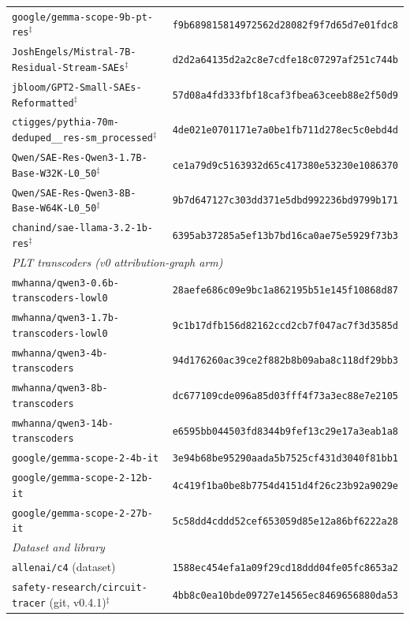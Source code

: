 \begin{table}[h]
\begin{tabular}{ll}
\texttt{google/gemma-scope-9b-pt-res}$^{\ddagger}$ & \texttt{f9b689815814972562d28082f9f7d65d7e01fdc8} \\
\texttt{JoshEngels/Mistral-7B-Residual-Stream-SAEs}$^{\ddagger}$ & \texttt{d2d2a64135d2a2c8e7cdfe18c07297af251c744b} \\
\texttt{jbloom/GPT2-Small-SAEs-Reformatted}$^{\ddagger}$ & \texttt{57d08a4fd333fbf18caf3fbea63ceeb88e2f50d9} \\
\texttt{ctigges/pythia-70m-deduped\_\_res-sm\_processed}$^{\ddagger}$ & \texttt{4de021e0701171e7a0be1fb711d278ec5c0ebd4d} \\
\texttt{Qwen/SAE-Res-Qwen3-1.7B-Base-W32K-L0\_50}$^{\ddagger}$ & \texttt{ce1a79d9c5163932d65c417380e53230e1086370} \\
\texttt{Qwen/SAE-Res-Qwen3-8B-Base-W64K-L0\_50}$^{\ddagger}$ & \texttt{9b7d647127c303dd371e5dbd992236bd9799b171} \\
\texttt{chanind/sae-llama-3.2-1b-res}$^{\ddagger}$ & \texttt{6395ab37285a5ef13b7bd16ca0ae75e5929f73b3} \\
\midrule
\multicolumn{2}{l}{\textit{PLT transcoders (v0 attribution-graph arm)}} \\
\texttt{mwhanna/qwen3-0.6b-transcoders-lowl0} & \texttt{28aefe686c09e9bc1a862195b51e145f10868d87} \\
\texttt{mwhanna/qwen3-1.7b-transcoders-lowl0} & \texttt{9c1b17dfb156d82162ccd2cb7f047ac7f3d3585d} \\
\texttt{mwhanna/qwen3-4b-transcoders}         & \texttt{94d176260ac39ce2f882b8b09aba8c118df29bb3} \\
\texttt{mwhanna/qwen3-8b-transcoders}         & \texttt{dc677109cde096a85d03fff4f73a3ec88e7e2105} \\
\texttt{mwhanna/qwen3-14b-transcoders}        & \texttt{e6595bb044503fd8344b9fef13c29e17a3eab1a8} \\
\texttt{google/gemma-scope-2-4b-it}           & \texttt{3e94b68be95290aada5b7525cf431d3040f81bb1} \\
\texttt{google/gemma-scope-2-12b-it}          & \texttt{4c419f1ba0be8b7754d4151d4f26c23b92a9029e} \\
\texttt{google/gemma-scope-2-27b-it}          & \texttt{5c58dd4cddd52cef653059d85e12a86bf6222a28} \\
\midrule
\multicolumn{2}{l}{\textit{Dataset and library}} \\
\texttt{allenai/c4} (dataset)                 & \texttt{1588ec454efa1a09f29cd18ddd04fe05fc8653a2} \\
\texttt{safety-research/circuit-tracer} (git, v0.4.1)$^{\ddagger}$ & \texttt{4bb8c0ea10bde09727e14565ec8469656880da53} \\
\bottomrule
\end{tabular}
\end{table}
